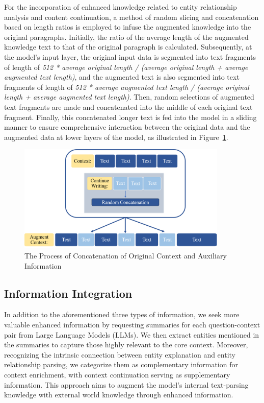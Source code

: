 \documentclass[a4paper,fleqn,twocolumn]{cas-dc}
\newcommand{\1}[1]{\mathds{1}\left[#1\right]}
\begin{document}
	For the incorporation of enhanced knowledge related to entity relationship analysis and content continuation, a method of random slicing and concatenation based on length ratios is employed to infuse the augmented knowledge into the original paragraphs. Initially, the ratio of the average length of the augmented knowledge text to that of the original paragraph is calculated. Subsequently, at the model's input layer, the original input data is segmented into text fragments of length of \textit{512 * average original length / (average original length + average augmented text length)}, and the augmented text is also segmented into text fragments of length of  \textit{512 * average augmented text length / (average original length + average augmented text length)}. Then, random selections of augmented text fragments are made and concatenated into the middle of each original text fragment. Finally, this concatenated longer text is fed into the model in a sliding manner to ensure comprehensive interaction between the original data and the augmented data at lower layers of the model, as illustrated in Figure~\ref{fig:random_concatenate}.
   


\begin{figure}[h]
	\centering
	\includegraphics[width=10cm]{RandomConcat.png}
	\caption{The Process of Concatenation of Original Context and Auxiliary Information}
	\label{fig:random_concatenate}
\end{figure}  

\subsection{Information Integration}
\label{sec:information_integration}
	In addition to the aforementioned three types of information, we seek more valuable enhanced information by requesting summaries for each question-context pair from Large Language Models (LLMs). We then extract entities mentioned in the summaries to capture those highly relevant to the core context. Moreover, recognizing the intrinsic connection between entity explanation and entity relationship parsing, we categorize them as complementary information for context enrichment, with context continuation serving as supplementary information. This approach aims to augment the model's internal text-parsing knowledge with external world knowledge through enhanced information. 
	
\end{document}
